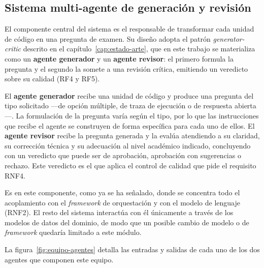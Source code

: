 \subsection{Sistema multi-agente de generación y revisión}
\label{sec:diseno-agentes}

El componente central del sistema es el responsable de transformar cada
unidad de código en una pregunta de examen. Su diseño adopta el patrón
\emph{generator-critic} descrito en el capítulo~\ref{cap:estado-arte}, que en
este trabajo se materializa como un \textbf{agente generador} y un
\textbf{agente revisor}: el primero formula la pregunta y el segundo la somete a
una revisión crítica, emitiendo un veredicto sobre su calidad (RF4 y RF5).

El \textbf{agente generador} recibe una unidad de código y produce una
pregunta del tipo solicitado ---de opción múltiple, de traza de ejecución
o de respuesta abierta---. La formulación de la pregunta varía según el
tipo, por lo que las instrucciones que recibe el agente se construyen de
forma específica para cada uno de ellos. El \textbf{agente revisor} recibe
la pregunta generada y la evalúa atendiendo a su claridad, su corrección
técnica y su adecuación al nivel académico indicado, concluyendo con un
veredicto que puede ser de aprobación, aprobación con sugerencias o
rechazo. Este veredicto es el que aplica el control de calidad
que pide el requisito RNF4.

Es en este componente, como ya se ha señalado, donde se concentra todo el
acoplamiento con el \emph{framework} de orquestación y con el modelo de
lenguaje (RNF2). El resto del sistema interactúa con él únicamente a través
de los modelos de datos del dominio, de modo que un posible cambio de
modelo o de \emph{framework} quedaría limitado a este módulo.

La figura~\ref{fig:equipo-agentes} detalla las entradas y salidas de cada uno
de los dos agentes que componen este equipo.


